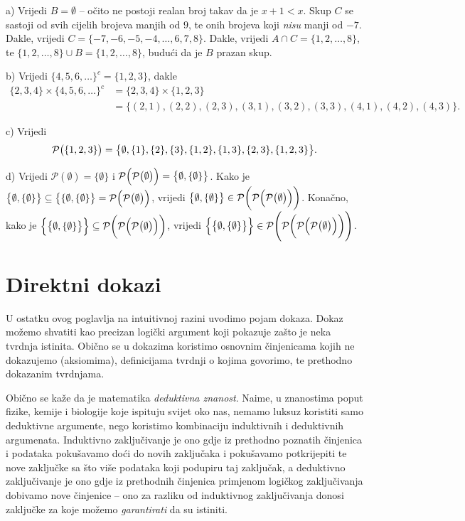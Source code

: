 \documentclass{book}
\let\originalleft\left
\let\originalright\right
\renewcommand{\left}{\mathopen{}\mathclose\bgroup\originalleft}
\renewcommand{\right}{\aftergroup\egroup\originalright}
\renewenvironment{proof}{%
    \vspace{-\parskip}\begin{oldproof}%
    }{%
    \end{oldproof}%
}
\theoremstyle{definition}
\theoremstyle{definition}
\theoremstyle{remark}
\begin{document}
\begin{proof}[Rješenje]
a) Vrijedi $B=\emptyset$ -- očito ne postoji realan broj takav da je $x+1<x$. Skup $C$ se sastoji od svih cijelih brojeva manjih od $9$, te onih brojeva koji \textit{nisu} manji od $-7$. Dakle, vrijedi $C=\{-7, -6, -5, -4, \dots, 6, 7, 8\}$. Dakle, vrijedi $A\cap C=\{1, 2, \dots, 8\}$, te $\{1, 2, \dots, 8\}\cup B=\{1, 2, \dots, 8\}$, budući da je $B$ prazan skup.

b) Vrijedi $\{4, 5, 6, \dots\}^c=\{1, 2, 3\}$, dakle 
\begin{align*}
\{2, 3, 4\}\times \{4, 5, 6, \dots\}^c&=\{2, 3, 4\}\times \{1, 2, 3\}\\
&=\{(2, 1), (2, 2), (2, 3), (3, 1), (3, 2), (3, 3), (4, 1), (4, 2), (4, 3)\}.
\end{align*}

c) Vrijedi
$$\mathcal{P}\left(\{1, 2, 3\}\right)=\left\{\emptyset, \{1\}, \{2\}, \{3\}, \{1, 2\}, \{1, 3\}, \{2, 3\}, \{1, 2, 3\}\right\}.$$

d) Vrijedi $\mathcal{P}(\emptyset)=\{\emptyset\}$ i $\mathcal{P}\left(\mathcal{P}\left(\emptyset\right)\right)=\left\{\emptyset, \{\emptyset\}\right\}$. Kako je $\left\{\emptyset, \{\emptyset\}\right\}\subseteq \left\{\{\emptyset, \{\emptyset\}\right\}=\mathcal{P}\left(\mathcal{P}\left(\emptyset\right)\right)$, vrijedi $\left\{\emptyset, \{\emptyset\}\right\}\in \mathcal{P}\left(\mathcal{P}\left(\mathcal{P}\left(\emptyset\right)\right)\right)$. Konačno, kako je $\left\{\left\{\emptyset, \{\emptyset\}\right\}\right\}\subseteq \mathcal{P}\left(\mathcal{P}\left(\mathcal{P}\left(\emptyset\right)\right)\right)$, vrijedi $\left\{\left\{\emptyset, \{\emptyset\}\right\}\right\}\in \mathcal{P}\left(\mathcal{P}\left(\mathcal{P}\left(\mathcal{P}\left(\emptyset\right)\right)\right)\right)$.
\end{proof}
\section{Direktni dokazi}
U ostatku ovog poglavlja na intuitivnoj razini uvodimo pojam dokaza. Dokaz možemo shvatiti kao precizan logički argument koji pokazuje zašto je neka tvrdnja istinita. Obično se u dokazima koristimo osnovnim činjenicama kojih ne dokazujemo (aksiomima), definicijama tvrdnji o kojima govorimo, te prethodno dokazanim tvrdnjama. 

Obično se kaže da je matematika \textit{deduktivna znanost}. Naime, u znanostima poput fizike, kemije i biologije koje ispituju svijet oko nas, nemamo luksuz koristiti samo deduktivne argumente, nego koristimo kombinaciju induktivnih i deduktivnih argumenata. Induktivno zaključivanje je ono gdje iz prethodno poznatih činjenica i podataka pokušavamo doći do novih zaključaka i pokušavamo potkrijepiti te nove zaključke sa što više podataka koji podupiru taj zaključak, a deduktivno zaključivanje je ono gdje iz prethodnih činjenica primjenom logičkog zaključivanja dobivamo nove činjenice -- ono za razliku od induktivnog zaključivanja donosi zaključke za koje možemo \textit{garantirati} da su istiniti. 
\end{document}
